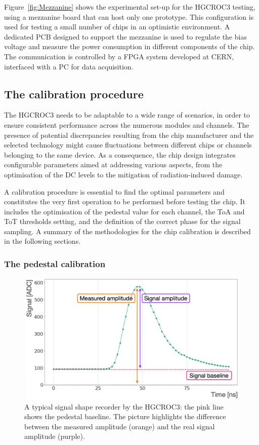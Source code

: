 Figure~\ref{fig:Mezzanine} shows the experimental set-up for the HGCROC3 testing, using a mezzanine board that can host only one prototype. This configuration is used for testing a small number of chips in an optimistic environment. A dedicated PCB designed to support the mezzanine is used to regulate the bias voltage and measure the power consumption in different components of the chip. The communication is controlled by a FPGA system developed at CERN, interfaced with a PC for data acquisition.

\subsection{The calibration procedure}
\label{subsec:The calibration procedure}

The HGCROC3 needs to be adaptable to a wide range of scenarios, in order to ensure consistent performance across the numerous modules and channels. The presence of potential discrepancies resulting from the chip manufacturer and the selected technology might cause fluctuations between different chips or channels belonging to the same device. As a consequence, the chip design integrates configurable parameters aimed at addressing various aspects, from the optimisation of the DC levels to the mitigation of radiation-induced damage. 

A calibration procedure is essential to find the optimal parameters and constitutes the very first operation to be performed before testing the chip. It includes the optimisation of the pedestal value for each channel, the ToA and ToT thresholds setting, and the definition of the correct phase for the signal sampling. A summary of the methodologies for the chip calibration is described in the following sections.

\subsubsection{The pedestal calibration}
\label{subsubsec:The pedestal calibration}

\begin{figure}
    \centering
    \includegraphics[width=0.6\linewidth]{Figures/HGCAL/SignalBaseline.pdf}
    \caption{A typical signal shape recorder by the HGCROC3: the pink line shows the pedestal baseline. The picture highlights the difference between the measured amplitude (orange) and the real signal amplitude (purple).}
    \label{fig:SignalBaseline}
\end{figure}

